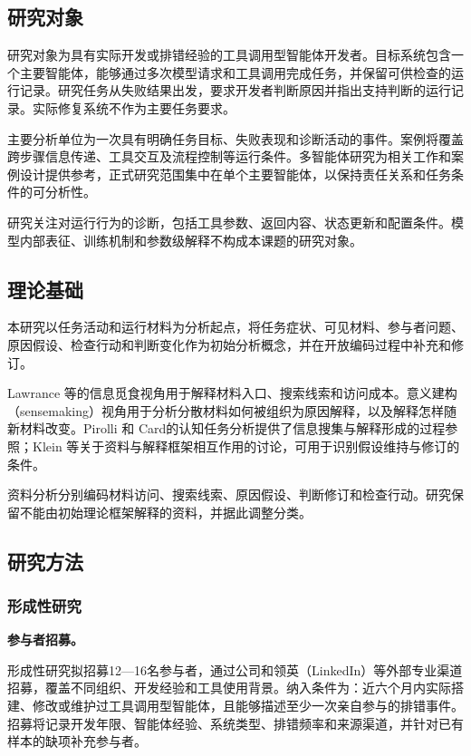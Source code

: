 \subsection{研究对象}

研究对象为具有实际开发或排错经验的工具调用型智能体开发者。目标系统包含一个主要智能体，能够通过多次模型请求和工具调用完成任务，并保留可供检查的运行记录。研究任务从失败结果出发，要求开发者判断原因并指出支持判断的运行记录。实际修复系统不作为主要任务要求。

主要分析单位为一次具有明确任务目标、失败表现和诊断活动的事件。案例将覆盖跨步骤信息传递、工具交互及流程控制等运行条件。多智能体研究为相关工作和案例设计提供参考，正式研究范围集中在单个主要智能体，以保持责任关系和任务条件的可分析性。

研究关注对运行行为的诊断，包括工具参数、返回内容、状态更新和配置条件。模型内部表征、训练机制和参数级解释不构成本课题的研究对象。

\subsection{理论基础}

本研究以任务活动和运行材料为分析起点，将任务症状、可见材料、参与者问题、原因假设、检查行动和判断变化作为初始分析概念，并在开放编码过程中补充和修订。

Lawrance 等\cite{ref08}的信息觅食视角用于解释材料入口、搜索线索和访问成本。意义建构（sensemaking）视角用于分析分散材料如何被组织为原因解释，以及解释怎样随新材料改变。Pirolli 和 Card\cite{ref17}的认知任务分析提供了信息搜集与解释形成的过程参照；Klein 等\cite{ref11}关于资料与解释框架相互作用的讨论，可用于识别假设维持与修订的条件。

资料分析分别编码材料访问、搜索线索、原因假设、判断修订和检查行动。研究保留不能由初始理论框架解释的资料，并据此调整分类。

\subsection{研究方法}

\subsubsection{形成性研究}

\noindent\textbf{参与者招募。}

形成性研究拟招募12—16名参与者，通过公司和领英（LinkedIn）等外部专业渠道招募，覆盖不同组织、开发经验和工具使用背景。纳入条件为：近六个月内实际搭建、修改或维护过工具调用型智能体，且能够描述至少一次亲自参与的排错事件。招募将记录开发年限、智能体经验、系统类型、排错频率和来源渠道，并针对已有样本的缺项补充参与者。


